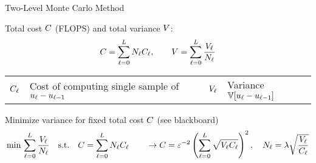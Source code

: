 \begin{frame}{Two-Level Monte Carlo Method}
    \begin{squarelist}
        \item<1-> Total cost $C$ (FLOPS) and total variance $V$:
        \begin{equation*}
            C = \sum_{\ell = 0}^L N_\ell C_\ell, \qquad V = \sum_{\ell = 0}^L\frac{V_\ell}{N_\ell}
        \end{equation*}
        \vspace{-1.5em}
        \begin{block}{}
            \begin{centering}
                \begin{tabular}{r|lcr|l}
                    $C_\ell$ & Cost of computing single sample of $u_\ell - u_{\ell-1}$ & &
                    $V_\ell$ & Variance $\mathbb{V}[u_\ell - u_{\ell-1}]$
                \end{tabular}
            \end{centering}
        \end{block}
        \vspace{0.5em}
        \item<2-> Minimize variance for fixed total cost $C$ (see blackboard)
            \begin{equation*}
                \min\, \sum_{\ell = 0}^L\frac{V_\ell}{N_\ell} \quad \text{s.t.} \quad C = \sum_{\ell = 0}^L N_\ell C_\ell \qquad \rightarrow C = \varepsilon^{-2}\left(\sum_{\ell = 0}^L \sqrt{V_\ell C_\ell}\right)^2, \quad N_\ell = \lambda\sqrt{\frac{V_\ell}{C_\ell}}
            \end{equation*}
    \end{squarelist}
\end{frame}

